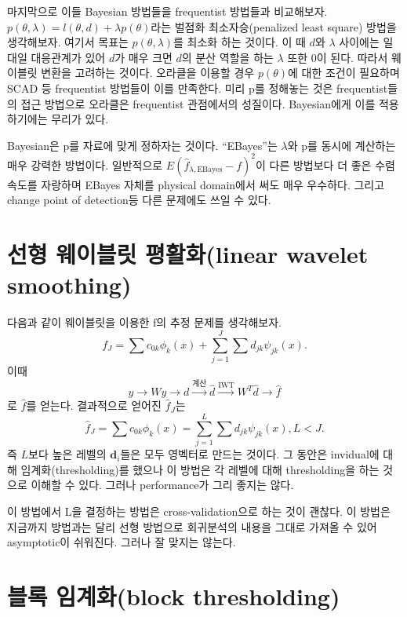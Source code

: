\documentclass[b5paper,]{scrbook}
\theoremstyle{plain}
\theoremstyle{definition}
\numberwithin{equation}{section}
\begin{document}
마지막으로 이들 Bayesian 방법들을 frequentist 방법들과 비교해보자. \(p(\theta,\lambda)=l(\theta, d)+\lambda p(\theta)\)라는 벌점화 최소자승(penalized least square) 방법을 생각해보자. 여기서 목표는 \(p(\theta,\lambda)\)를 최소화 하는 것이다. 이 때 \(d\)와 \(\lambda\) 사이에는 일대일 대응관계가 있어 \(d\)가 매우 크면 \(d\)의 분산 역할을 하는 \(\lambda\) 또한 0이 된다. 따라서 웨이블릿 변환을 고려하는 것이다. 오라클을 이용할 경우 \(p(\theta)\)에 대한 조건이 필요하며 SCAD 등 frequentist 방법들이 이를 만족한다. 미리 p를 정해놓는 것은 frequentist들의 접근 방법으로 오라클은 frequentist 관점에서의 성질이다. Bayesian에게 이를 적용하기에는 무리가 있다.

Bayesian은 p를 자료에 맞게 정하자는 것이다. ``EBayes''는 \(\lambda\)와 p를 동시에 계산하는 매우 강력한 방법이다. 일반적으로 \(E(\hat{f}_{\lambda, \text{EBayes}}-f)^{2}\)이 다른 방법보다 더 좋은 수렴속도를 자랑하며 EBayes 자체를 physical domain에서 써도 매우 우수하다. 그리고 change point of detection등 다른 문제에도 쓰일 수 있다.

\hypertarget{--linear-wavelet-smoothing}{%
\section{선형 웨이블릿 평활화(linear wavelet smoothing)}\label{--linear-wavelet-smoothing}}

다음과 같이 웨이블릿을 이용한 f의 추정 문제를 생각해보자.
\[f_{J}=\sum c_{0k}\phi_{k}(x)+\sum_{j=1}^{J}\sum d_{jk}\psi_{jk}(x).\]
이때
\[y \rightarrow Wy \rightarrow d \xrightarrow{\text{계산}} \hat{d} \xrightarrow{\text{IWT}} W^{T}\hat{d} \rightarrow \hat{f}\]
로 \(\hat{f}\)를 얻는다. 결과적으로 얻어진 \(\hat{f}_{J}\)는
\[\hat{f}_{J}=\sum c_{0k}\phi_{k}(x)=\sum_{j=1}^{L}\sum d_{jk}\psi_{jk}(x), L<J.\]
즉 \(L\)보다 높은 레벨의 \(\mathbf{d}_{i}\)들은 모두 영벡터로 만드는 것이다. 그 동안은 invidual에 대해 임계화(thresholding)를 했으나 이 방법은 각 레벨에 대해 thresholding을 하는 것으로 이해할 수 있다. 그러나 performance가 그리 좋지는 않다.

이 방법에서 L을 결정하는 방법은 cross-validation으로 하는 것이 괜찮다. 이 방법은 지금까지 방법과는 달리 선형 방법으로 회귀분석의 내용을 그대로 가져올 수 있어 asymptotic이 쉬워진다. 그러나 잘 맞지는 않는다.

\hypertarget{-block-thresholding}{%
\section{블록 임계화(block thresholding)}\label{-block-thresholding}}
\end{document}
